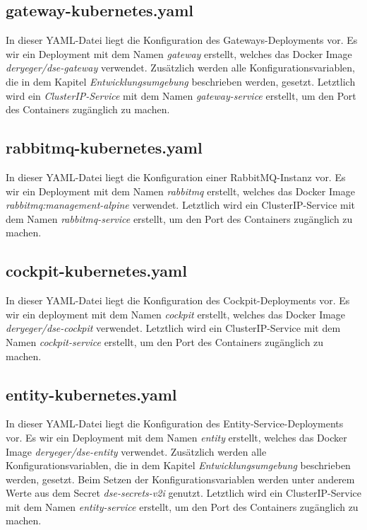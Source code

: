 \subsection{gateway-kubernetes.yaml}

In dieser YAML-Datei liegt die Konfiguration des Gateways-Deployments vor.
Es wir ein Deployment mit dem Namen \textit{gateway} erstellt, welches das Docker Image \textit{deryeger/dse-gateway} verwendet.
Zusätzlich werden alle Konfigurationsvariablen, die in dem Kapitel \textit{Entwicklungsumgebung} beschrieben werden, gesetzt. 
Letztlich wird ein \textit{ClusterIP-Service} mit dem Namen \textit{gateway-service} erstellt, um den Port des Containers zugänglich zu machen.

\subsection{rabbitmq-kubernetes.yaml}

In dieser YAML-Datei liegt die Konfiguration einer RabbitMQ-Instanz vor.
Es wir ein Deployment mit dem Namen \textit{rabbitmq} erstellt, welches das Docker Image \textit{rabbitmq:management-alpine} verwendet. 
Letztlich wird ein ClusterIP-Service mit dem Namen \textit{rabbitmq-service} erstellt, um den Port des Containers zugänglich zu machen.

\subsection{cockpit-kubernetes.yaml}

In dieser YAML-Datei liegt die Konfiguration des Cockpit-Deployments vor.
Es wir ein deployment mit dem Namen \textit{cockpit} erstellt, welches das Docker Image \textit{deryeger/dse-cockpit} verwendet. 
Letztlich wird ein ClusterIP-Service mit dem Namen \textit{cockpit-service} erstellt, um den Port des Containers zugänglich zu machen.

\subsection{entity-kubernetes.yaml}

In dieser YAML-Datei liegt die Konfiguration des Entity-Service-Deployments vor.
Es wir ein Deployment mit dem Namen \textit{entity} erstellt, welches das Docker Image \textit{deryeger/dse-entity} verwendet.
Zusätzlich werden alle Konfigurationsvariablen, die in dem Kapitel \textit{Entwicklungsumgebung} beschrieben werden, gesetzt. 
Beim Setzen der Konfigurationsvariablen werden unter anderem Werte aus dem Secret \textit{dse-secrets-v2i} genutzt.
Letztlich wird ein ClusterIP-Service mit dem Namen \textit{entity-service} erstellt, um den Port des Containers zugänglich zu machen.

